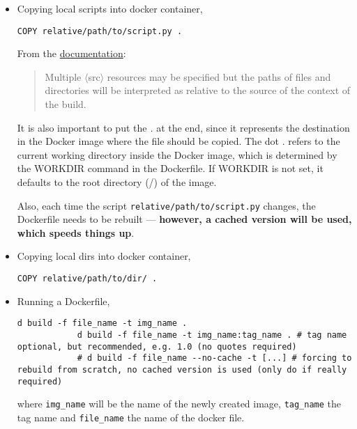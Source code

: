 \documentclass[12pt, a4paper]{scrbook}
\numberwithin{equation}{section}
\theoremstyle{definition}
\theoremstyle{definition}
\begin{document}
\begin{itemize}
		\item Copying local scripts into docker container, 
		
		\begin{lstlisting}[style=mystylebash, label=alg:docker_copy, xleftmargin=\parindent]
			COPY relative/path/to/script.py .
		\end{lstlisting}
		
		From the \href{https://docs.docker.com/engine/reference/builder/#copy}{documentation}:
		
		\begin{quote}
			Multiple $\langle$src$\rangle$ resources may be specified but the paths of files and directories will be interpreted as relative to the source of the context of the build. 
		\end{quote}
		
		It is also important to put the \textit{.} at the end, since it represents the destination in the Docker image where the file should be copied. The dot . refers to the current working directory inside the Docker image, which is determined by the WORKDIR command in the Dockerfile. If WORKDIR is not set, it defaults to the root directory (/) of the image.
		
		Also, each time the script \texttt{relative/path/to/script.py} changes, the Dockerfile needs to be rebuilt --- \textbf{however, a cached version will be used, which speeds things up}.
		
		\item Copying local dirs into docker container, 
		
		\begin{lstlisting}[style=mystylebash, label=alg:docker__copy_dir, xleftmargin=\parindent]
			COPY relative/path/to/dir/ .
		\end{lstlisting}
		
		\item Running a Dockerfile,
		
		\begin{lstlisting}[style=mystylebash, label=alg:docker_build, xleftmargin=\parindent]
			d build -f file_name -t img_name .
			d build -f file_name -t img_name:tag_name . # tag name optional, but recommended, e.g. 1.0 (no quotes required)
			# d build -f file_name --no-cache -t [...] # forcing to rebuild from scratch, no cached version is used (only do if really required)
		\end{lstlisting} 
		
		where \texttt{img\_name} will be the name of the newly created image, \texttt{tag\_name} the tag name and \texttt{file\_name} the name of the docker file. 
		

\end{itemize}
\end{document}
